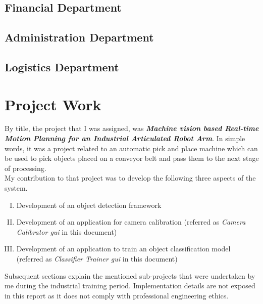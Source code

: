 \documentclass[a4paper,12pt]{report}%
\begin{document}
\section{Financial Department}

\section{Administration Department}

\section{Logistics Department}

\chapter{Project Work}
\label{Project Work}
By title, the project that I was assigned, was \textbf{\textit{Machine vision based Real-time Motion Planning for an Industrial Articulated Robot Arm}}. In simple words, it was a project related to an automatic pick and place machine which can be used to pick objects placed on a conveyor belt and pass them to the next stage of processing.\\

My contribution to that project was to develop the following three aspects of the system. 

\begin{enumerate}[I.]
	\item Development of an object detection framework
	
	\item Development of an application for camera calibration (referred as \textit{Camera Calibrator \ac{gui}} in this document)
	
	\item Development of an application to train an object classification model (referred as \textit{Classifier Trainer \ac{gui}} in this document)
	
\end{enumerate}

Subsequent sections explain the mentioned sub-projects that were undertaken by me during the industrial training period. Implementation details are not exposed in this report as it does not comply with professional engineering ethics.
\end{document}

